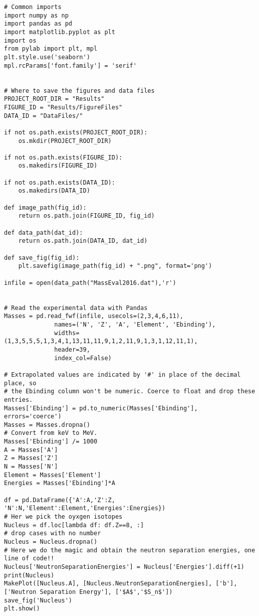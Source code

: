 \documentclass[%
oneside,                 %
final,                   %
10pt]{article}
\newenvironment{doconceexercise}{}{}
\begin{document}
\begin{doconceexercise}
\begin{verbatim}
# Common imports
import numpy as np
import pandas as pd
import matplotlib.pyplot as plt
import os
from pylab import plt, mpl
plt.style.use('seaborn')
mpl.rcParams['font.family'] = 'serif'


# Where to save the figures and data files
PROJECT_ROOT_DIR = "Results"
FIGURE_ID = "Results/FigureFiles"
DATA_ID = "DataFiles/"

if not os.path.exists(PROJECT_ROOT_DIR):
    os.mkdir(PROJECT_ROOT_DIR)

if not os.path.exists(FIGURE_ID):
    os.makedirs(FIGURE_ID)

if not os.path.exists(DATA_ID):
    os.makedirs(DATA_ID)

def image_path(fig_id):
    return os.path.join(FIGURE_ID, fig_id)

def data_path(dat_id):
    return os.path.join(DATA_ID, dat_id)

def save_fig(fig_id):
    plt.savefig(image_path(fig_id) + ".png", format='png')

infile = open(data_path("MassEval2016.dat"),'r')


# Read the experimental data with Pandas
Masses = pd.read_fwf(infile, usecols=(2,3,4,6,11),
              names=('N', 'Z', 'A', 'Element', 'Ebinding'),
              widths=(1,3,5,5,5,1,3,4,1,13,11,11,9,1,2,11,9,1,3,1,12,11,1),
              header=39,
              index_col=False)

# Extrapolated values are indicated by '#' in place of the decimal place, so
# the Ebinding column won't be numeric. Coerce to float and drop these entries.
Masses['Ebinding'] = pd.to_numeric(Masses['Ebinding'], errors='coerce')
Masses = Masses.dropna()
# Convert from keV to MeV.
Masses['Ebinding'] /= 1000
A = Masses['A']
Z = Masses['Z']
N = Masses['N']
Element = Masses['Element']
Energies = Masses['Ebinding']*A

df = pd.DataFrame({'A':A,'Z':Z, 'N':N,'Element':Element,'Energies':Energies})
# Her we pick the oyxgen isotopes
Nucleus = df.loc[lambda df: df.Z==8, :]
# drop cases with no number
Nucleus = Nucleus.dropna()
# Here we do the magic and obtain the neutron separation energies, one line of code!!
Nucleus['NeutronSeparationEnergies'] = Nucleus['Energies'].diff(+1)
print(Nucleus)
MakePlot([Nucleus.A], [Nucleus.NeutronSeparationEnergies], ['b'], ['Neutron Separation Energy'], ['$A$','$S_n$'])
save_fig('Nucleus')
plt.show()


\end{verbatim}



\end{doconceexercise}


\end{document}
